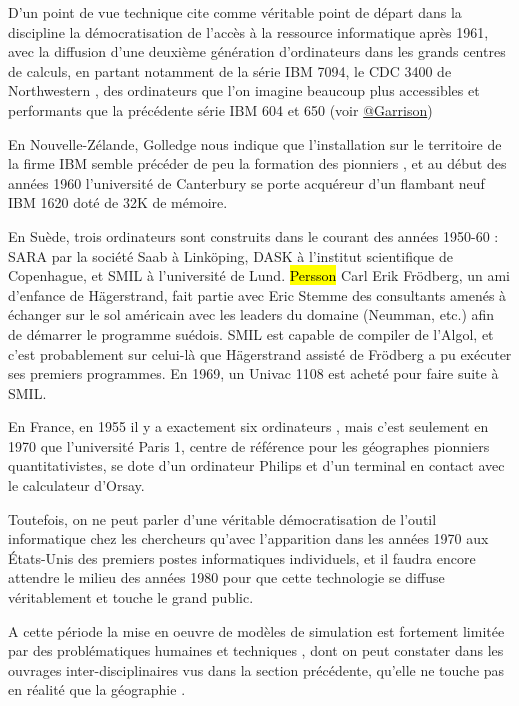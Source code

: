 D'un point de vue technique \textcite{Haggett1969} cite comme véritable point de départ dans la discipline la  démocratisation de l'accès à la ressource informatique après 1961, avec la diffusion d'une deuxième génération d'ordinateurs dans les grands centres de calculs, en partant notamment de la série IBM 7094, le CDC 3400 de Northwestern \autocite[3]{Marble1967}, des ordinateurs que l'on imagine beaucoup plus accessibles et performants que la précédente série IBM 604 et 650 (voir \href{http://www.aag.org/cs/garrison}{@Garrison})

En Nouvelle-Zélande, Golledge nous indique que l'installation sur le territoire de la firme IBM semble précéder de peu la formation des pionniers \autocite[94]{Bailly2000}, et au début des années 1960 l'université de Canterbury se porte acquéreur d'un flambant neuf IBM 1620 doté de 32K de mémoire.

En Suède, trois ordinateurs sont construits dans le courant des années 1950-60 : SARA par la société Saab à Linköping, DASK à l'institut scientifique de Copenhague, et SMIL à l'université de Lund. \hl{Persson} Carl Erik Frödberg, un ami d'enfance de Hägerstrand, fait partie avec Eric Stemme des consultants amenés à échanger sur le sol américain avec les leaders du domaine (Neumman, etc.) afin de démarrer le programme suédois.  SMIL est capable de compiler de l'Algol, et c'est probablement sur celui-là que Hägerstrand assisté de Frödberg a pu exécuter ses premiers programmes. En 1969, un Univac 1108 est acheté pour faire suite à SMIL.

En France, en 1955 il y a exactement six ordinateurs \autocite[3]{Armatte2008}, mais c'est seulement en 1970 que l'université Paris 1, centre de référence pour les géographes pionniers quantitativistes, se dote d'un ordinateur Philips et d'un terminal en contact avec le calculateur d'Orsay.

Toutefois, on ne peut parler d'une véritable démocratisation de l'outil informatique chez les chercheurs qu'avec l'apparition dans les années 1970 aux États-Unis des premiers postes informatiques individuels, et il faudra encore attendre le milieu des années 1980 pour que cette technologie se diffuse véritablement et touche le grand public.

A cette période la mise en oeuvre de modèles de simulation est fortement limitée par des problématiques humaines et techniques \autocites{Haggett1969}[387]{Marble1972}, dont on peut constater dans les ouvrages inter-disciplinaires vus dans la section précédente, qu'elle ne touche pas en réalité que la géographie \autocite{Guetzkow1972}.

